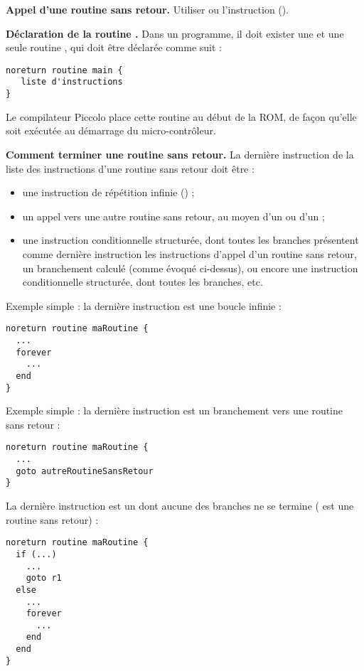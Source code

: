 \textbf{Appel d’une routine sans retour.} Utiliser  ou l'instruction  ().


\textbf{Déclaration de la routine .} Dans un programme, il doit exister une et une seule routine , qui doit être déclarée comme suit :

\begin{lstlisting}[language=piccolo]
noreturn routine main {
   liste d'instructions
}

\end{lstlisting}

Le compilateur Piccolo place cette routine au début de la ROM, de façon qu'elle soit exécutée au démarrage du micro-contrôleur.


\textbf{Comment terminer une routine sans retour.} La dernière instruction de la liste des instructions d’une routine sans retour doit être :
\begin{itemize}
  \item une instruction de répétition infinie () ;
  \item un appel vers une autre routine sans retour, au moyen d’un  ou d'un  ;
  \item une instruction conditionnelle structurée, dont toutes les branches présentent comme dernière instruction les instructions d’appel d’un routine sans retour, un branchement calculé (comme évoqué ci-dessus), ou encore une instruction conditionnelle structurée, dont toutes les branches, etc.

\end{itemize}

Exemple simple : la dernière instruction est une boucle infinie :
\begin{lstlisting}[language=piccolo]
noreturn routine maRoutine {
  ...
  forever
    ...
  end
}
\end{lstlisting}

Exemple simple : la dernière instruction est un branchement vers une routine sans retour :
\begin{lstlisting}[language=piccolo]
noreturn routine maRoutine {
  ...
  goto autreRoutineSansRetour
}
\end{lstlisting}


La dernière instruction est un  dont aucune des branches ne se termine ( est une routine sans retour) :
\begin{lstlisting}[language=piccolo]
noreturn routine maRoutine {
  if (...)
    ...
    goto r1
  else
    ...
    forever
      ...
    end
  end
}

\end{lstlisting}


